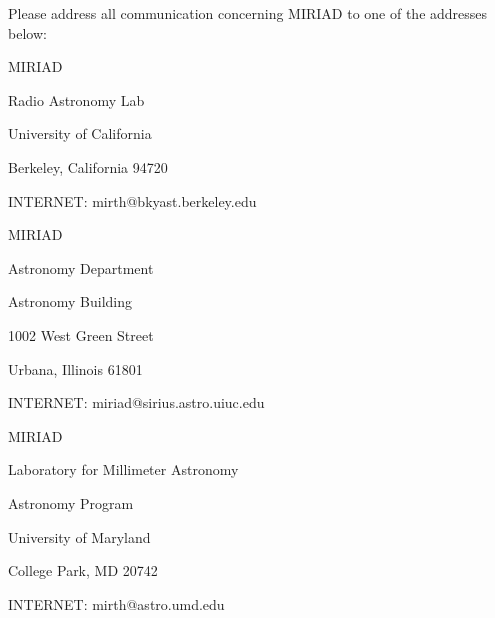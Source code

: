 {
Please address all communication concerning MIRIAD to one of
the addresses below: \medskip\par
{\parindent=0.5cm
MIRIAD                                  \par
Radio Astronomy Lab                     \par
University of California                \par
Berkeley, California  94720             \par
INTERNET:  mirth@bkyast.berkeley.edu    \par
\medskip\par
MIRIAD                                  \par
Astronomy Department                    \par
Astronomy Building                      \par
1002 West Green Street                  \par
Urbana, Illinois  61801                 \par
INTERNET:  miriad@sirius.astro.uiuc.edu \par
\medskip\par
MIRIAD                                  \par
Laboratory for Millimeter Astronomy     \par
Astronomy Program                       \par
University of Maryland                  \par
College Park, MD  20742                 \par
INTERNET:  mirth@astro.umd.edu          \par
}
}
\vfill
\eject

